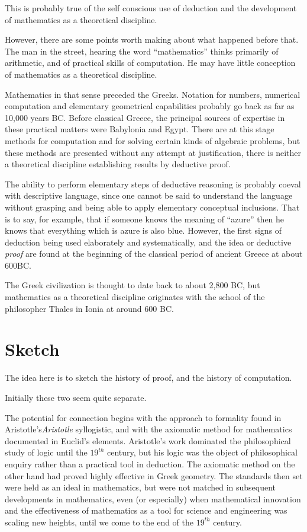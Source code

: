 This is probably true of the self conscious use of deduction and the
development of mathematics as a theoretical discipline.

However, there are some points worth making about what happened before
that.
The man in the street, hearing the word ``mathematics'' thinks
primarily of arithmetic, and of practical skills of computation.
He may have little conception of mathematics as a theoretical
discipline.

Mathematics in that sense preceded the Greeks.
Notation for numbers, numerical computation and elementary
geometrical capabilities probably go back as far as 10,000
years BC.
Before classical Greece, the principal sources of expertise in these
practical matters were Babylonia and Egypt.
There are at this stage methods for computation and for solving
certain kinds of algebraic problems, but these methods are presented
without any attempt at justification, there is neither a theoretical
discipline establishing results by deductive proof.

The ability to perform elementary steps of deductive reasoning is
probably coeval with descriptive language, since one cannot be said to
understand the language without grasping and being able to apply
elementary conceptual inclusions.
That is to say, for example, that if someone knows the meaning of
``azure'' then he knows that everything which is azure is also blue.
However, the first signs of deduction being used elaborately and
systematically, and the idea or deductive \emph{proof} are found at
the beginning of the classical period of ancient Greece at about 600BC.

The Greek civilization is thought to date back to about 2,800 BC, but
mathematics as a theoretical discipline originates with the school of
the philosopher Thales in Ionia at around 600 BC.

\section{Sketch}

The idea here is to sketch the history of proof, and the history of computation.

Initially these two seem quite separate.

The potential for connection begins with the approach to formality
found in Aristotle's\emph{Aristotle} syllogistic, and with the axiomatic method for
mathematics documented in Euclid's elements.
Aristotle's work dominated the philosophical study of logic until the
$19^{th}$ century, but his logic was the object of philosophical
enquiry rather than a practical tool in deduction.
The axiomatic method on the other hand had proved highly effective in
Greek geometry.
The standards then set were held as an ideal in mathematics, but were
not matched in subsequent developments in mathematics, even (or
especially) when mathematical innovation and the effectiveness of
mathematics as a tool for science and engineering was scaling new
heights, until we come to the end of the $19^{th}$ century.

